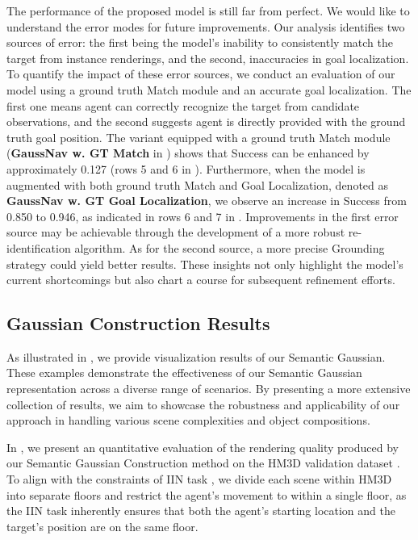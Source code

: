The performance of the proposed model is still far from perfect. We would like to understand the error modes for future improvements. Our analysis identifies two sources of error: the first being the model's inability to consistently match the target from instance renderings, and the second, inaccuracies in goal localization. To quantify the impact of these error sources, we conduct an evaluation of our model using a ground truth Match module and an accurate goal localization. The first one means agent can correctly recognize the target from candidate observations, and the second suggests agent is directly provided with the ground truth goal position. The variant equipped with a ground truth Match module (\textbf{GaussNav w. GT Match} in ) shows that Success can be enhanced by approximately 0.127 (rows 5 and 6 in ). Furthermore, when the model is augmented with both ground truth Match and Goal Localization, denoted as \textbf{GaussNav w. GT Goal Localization}, we observe an increase in Success from 0.850 to 0.946, as indicated in rows 6 and 7 in . Improvements in the first error source may be achievable through the development of a more robust re-identification algorithm. As for the second source, a more precise Grounding strategy could yield better results. These insights not only highlight the model's current shortcomings but also chart a course for subsequent refinement efforts.

\vspace{-3pt}


\subsection{Gaussian Construction Results}



As illustrated in , we provide visualization results of our Semantic Gaussian. These examples demonstrate the effectiveness of our Semantic Gaussian representation across a diverse range of scenarios. By presenting a more extensive collection of results, we aim to showcase the robustness and applicability of our approach in handling various scene complexities and object compositions.

In , we present an quantitative evaluation of the rendering quality produced by our Semantic Gaussian Construction method on the HM3D validation dataset \cite{yadav2023habitat}. To align with the constraints of IIN task \cite{krantz2022instancespecific}, we divide each scene within HM3D into separate floors and restrict the agent's movement to within a single floor, as the IIN task \cite{krantz2022instancespecific} inherently ensures that both the agent's starting location and the target's position are on the same floor.

